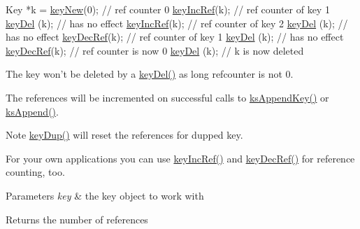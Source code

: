 \begin{DoxyCodeInclude}
Key *k = \hyperlink{group__key_gad23c65b44bf48d773759e1f9a4d43b89}{keyNew}(0); \textcolor{comment}{// ref counter 0}
\hyperlink{group__key_ga6970a6f254d67af7e39f8e469bb162f1}{keyIncRef}(k); \textcolor{comment}{// ref counter of key 1}
\hyperlink{group__key_ga3df95bbc2494e3e6703ece5639be5bb1}{keyDel} (k);   \textcolor{comment}{// has no effect}
\hyperlink{group__key_ga6970a6f254d67af7e39f8e469bb162f1}{keyIncRef}(k); \textcolor{comment}{// ref counter of key 2}
\hyperlink{group__key_ga3df95bbc2494e3e6703ece5639be5bb1}{keyDel} (k);   \textcolor{comment}{// has no effect}
\hyperlink{group__key_ga2c6433ca22109e4e141946057eccb283}{keyDecRef}(k); \textcolor{comment}{// ref counter of key 1}
\hyperlink{group__key_ga3df95bbc2494e3e6703ece5639be5bb1}{keyDel} (k);   \textcolor{comment}{// has no effect}
\hyperlink{group__key_ga2c6433ca22109e4e141946057eccb283}{keyDecRef}(k); \textcolor{comment}{// ref counter is now 0}
\hyperlink{group__key_ga3df95bbc2494e3e6703ece5639be5bb1}{keyDel} (k); \textcolor{comment}{// k is now deleted}
\end{DoxyCodeInclude}
 The key won't be deleted by a \hyperlink{group__key_ga3df95bbc2494e3e6703ece5639be5bb1}{key\+Del()} as long refcounter is not 0.

The references will be incremented on successful calls to \hyperlink{group__keyset_gaa5a1d467a4d71041edce68ea7748ce45}{ks\+Append\+Key()} or \hyperlink{group__keyset_ga21eb9c3a14a604ee3a8bdc779232e7b7}{ks\+Append()}.

\begin{DoxyNote}{Note}
\hyperlink{group__key_gae6ec6a60cc4b8c1463fa08623d056ce3}{key\+Dup()} will reset the references for dupped key.
\end{DoxyNote}
For your own applications you can use \hyperlink{group__key_ga6970a6f254d67af7e39f8e469bb162f1}{key\+Inc\+Ref()} and \hyperlink{group__key_ga2c6433ca22109e4e141946057eccb283}{key\+Dec\+Ref()} for reference counting, too.


\begin{DoxyParams}{Parameters}
{\em key} & the key object to work with \\
\hline
\end{DoxyParams}
\begin{DoxyReturn}{Returns}
the number of references 
\end{DoxyReturn}

